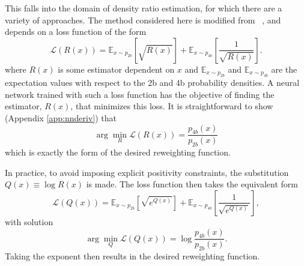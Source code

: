 This falls into the domain of density ratio estimation, for which there are a variety
of approaches. The method considered here is modified from ~\cite{NNloss, NNloss1}, and depends on
a loss function of the form
\begin{equation}
\mathcal{L}(R(x)) = \mathbb{E}_{x\sim p_{2b}}[\sqrt{R(x)}]
+\mathbb{E}_{x\sim p_{4b}}[\frac{1}{\sqrt{R(x)}}].
\end{equation}
where $R(x)$ is some estimator dependent on $x$ and $\mathbb{E}_{x\sim p_{2b}}$ and 
$\mathbb{E}_{x\sim p_{4b}}$ are the expectation values with respect to the 2b and 4b probability 
densities. A neural network trained with such a loss function has the objective of finding
the estimator, $R(x)$, that minimizes this loss. It is straightforward to show
(Appendix \ref{app:nnderiv}) that
\begin{equation}
\arg \min_{R}\mathcal{L}(R(x)) = \frac{p_{4b}(x)}{p_{2b}(x)}
\end{equation}
which is exactly the form of the desired reweighting function.

In practice, to avoid imposing explicit positivity constraints, the substitution
$Q(x) \equiv \log R(x)$ is made. The loss function then takes the equivalent form
\begin{equation}
\mathcal{L}(Q(x)) = \mathbb{E}_{x\sim p_{2b}}[\sqrt{e^{Q(x)}}]
+\mathbb{E}_{x\sim p_{4b}}[\frac{1}{\sqrt{e^{Q(x)}}}],
\end{equation}
with solution
\begin{equation}
\arg \min_{Q}\mathcal{L}(Q(x)) = \log\frac{p_{4b}(x)}{p_{2b}(x)}.
\end{equation}
Taking the exponent then results in the desired reweighting function.


